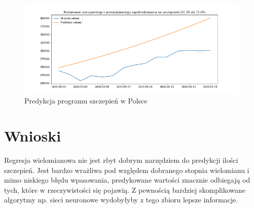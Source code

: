 \documentclass[12pt, oneside]{article}
\begin{document}
\begin{figure}[h!]
\centering
\includegraphics[height=0.25\textheight]{../img/demand2.png} 
\caption{Predykcja programu szczepień w Polsce}
\label{Rys:boxplotSamples}
\end{figure}


\section{Wnioski}

Regresja wielomianowa nie jest zbyt dobrym narzędziem do predykcji ilości szczepień. Jest bardzo wrażliwa pod względem dobranego stopnia wielomianu i mimo niskiego błędu wpasowania, predykowane wartości znacznie odbiegają od tych, które w rzeczywistości się pojawią. Z pewnością bardziej skomplikowane algorytmy np. sieci neuronowe wydobyłyby z tego zbioru lepsze informacje. 
\end{document}
